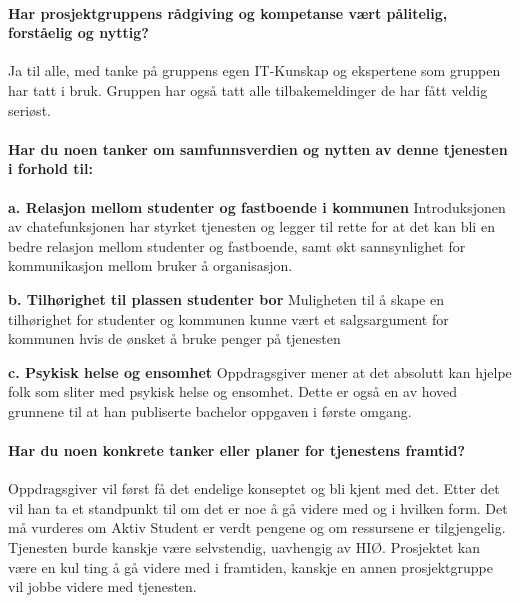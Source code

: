 \paragraph{Har prosjektgruppens rådgiving og kompetanse vært pålitelig, forståelig og nyttig?}
Ja til alle, med tanke på gruppens egen IT-Kunskap og ekspertene som gruppen har tatt i bruk. Gruppen har også tatt alle tilbakemeldinger de har fått veldig seriøst.

\paragraph{Har du noen tanker om samfunnsverdien og nytten av denne tjenesten i forhold til:}

{\bf a. Relasjon mellom studenter og fastboende i kommunen}
Introduksjonen av chatefunksjonen har styrket tjenesten og legger til rette for at det kan bli en bedre relasjon mellom studenter og fastboende, samt økt sannsynlighet for kommunikasjon mellom bruker å organisasjon.

{\bf b. Tilhørighet til plassen studenter bor}
Muligheten til å skape en tilhørighet for studenter og kommunen kunne vært et salgsargument for kommunen hvis de ønsket å bruke penger på tjenesten

{\bf c. Psykisk helse og ensomhet}
Oppdragsgiver mener at det absolutt kan hjelpe folk som sliter med psykisk helse og ensomhet. Dette er også en av hoved grunnene til at han publiserte bachelor oppgaven i første omgang.

\paragraph{Har du noen konkrete tanker eller planer for tjenestens framtid?}
Oppdragsgiver vil først få det endelige konseptet og bli kjent med det. Etter det vil han ta et standpunkt til om det er noe å gå videre med og i hvilken form. Det må vurderes om Aktiv Student er verdt pengene og om ressursene er tilgjengelig. Tjenesten burde kanskje være selvstendig, uavhengig av HIØ. Prosjektet kan være en kul ting å gå videre med i framtiden, kanskje en annen prosjektgruppe vil jobbe videre med tjenesten.



